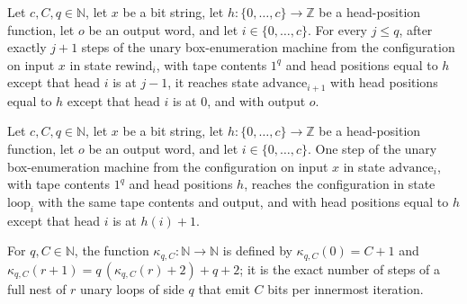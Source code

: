 \begin{lemma}
\label{Complexity.poly_rewind}
\leanok
{}
Let $c,C,q\in\mathbb{N}$, let $x$ be a bit string, let $h:\{0,\ldots,c\}\to\mathbb{Z}$
be a head-position function, let $o$ be an output word, and let $i\in\{0,\ldots,c\}$.
For every $j\le q$, after exactly $j+1$ steps of the unary box-enumeration machine from
the configuration on input $x$ in state $\mathrm{rewind}_i$, with tape contents $1^q$
and head positions equal to $h$ except that head $i$ is at $j-1$, it reaches state
$\mathrm{advance}_{i+1}$ with head positions equal to $h$ except that head $i$ is at
$0$, and with output $o$.
\end{lemma}

\begin{lemma}
\label{Complexity.poly_advance}
\leanok
{}
Let $c,C,q\in\mathbb{N}$, let $x$ be a bit string, let $h:\{0,\ldots,c\}\to\mathbb{Z}$
be a head-position function, let $o$ be an output word, and let $i\in\{0,\ldots,c\}$.
One step of the unary box-enumeration machine from the configuration on input $x$ in
state $\mathrm{advance}_i$, with tape contents $1^q$ and head positions $h$, reaches the
configuration in state $\mathrm{loop}_i$ with the same tape contents and output, and
with head positions equal to $h$ except that head $i$ is at $h(i)+1$.
\end{lemma}

\begin{definition}
\label{Complexity.polyCost}
\leanok
For $q, C \in \mathbb{N}$, the function $\kappa_{q,C} \colon \mathbb{N} \to \mathbb{N}$ is defined by $\kappa_{q,C}(0) = C + 1$ and $\kappa_{q,C}(r+1) = q\,(\kappa_{q,C}(r) + 2) + q + 2$; it is the exact number of steps of a full nest of $r$ unary loops of side $q$ that emit $C$ bits per innermost iteration.
\end{definition}

